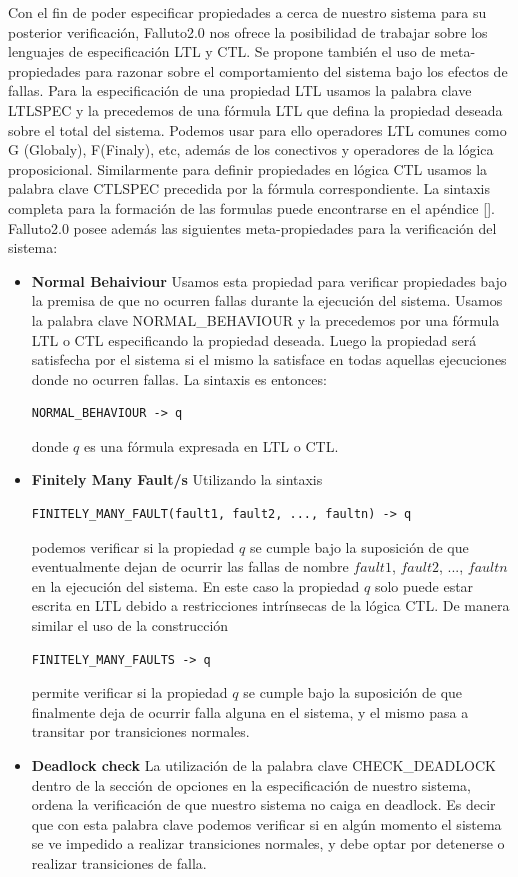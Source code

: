 \documentclass[titlepage, 12pt]{book}
\begin{document}
Con el fin de poder especificar propiedades a cerca de nuestro sistema para su posterior verificación, Falluto2.0 nos ofrece la posibilidad de trabajar sobre los lenguajes de especificación LTL y CTL. Se propone también el uso de meta-propiedades para razonar sobre el comportamiento del sistema bajo los efectos de fallas.
Para la especificación de una propiedad LTL usamos la palabra clave LTLSPEC y la precedemos de una fórmula LTL que defina la propiedad deseada sobre el total del sistema. Podemos usar para ello operadores LTL comunes como G (Globaly), F(Finaly), etc, además de los conectivos y operadores de la lógica proposicional. Similarmente para definir propiedades en lógica CTL usamos la palabra clave CTLSPEC precedida por la fórmula correspondiente. La sintaxis completa para la formación de las formulas puede encontrarse en el apéndice \ref{}.\\
Falluto2.0 posee además las siguientes meta-propiedades para la verificación del sistema:
\begin{itemize}
\item \textbf{Normal Behaiviour} Usamos esta propiedad para verificar propiedades bajo la premisa de que no ocurren fallas durante la ejecución del sistema. Usamos la palabra clave NORMAL\_BEHAVIOUR y la precedemos por una fórmula LTL o CTL especificando la propiedad deseada. Luego la propiedad será satisfecha por el sistema si el mismo la satisface en todas aquellas ejecuciones donde no ocurren fallas. La sintaxis es entonces: \begin{verbatim}NORMAL_BEHAVIOUR -> q \end{verbatim} donde $q$ es una fórmula expresada en LTL o CTL.
\item \textbf{Finitely Many Fault/s} Utilizando la sintaxis \begin{verbatim}FINITELY_MANY_FAULT(fault1, fault2, ..., faultn) -> q\end{verbatim} podemos verificar si la propiedad $q$ se cumple bajo la suposición de que eventualmente dejan de ocurrir las fallas de nombre $fault1$, $fault2$, ..., $faultn$ en la ejecución del sistema. En este caso la propiedad $q$ solo puede estar escrita en LTL debido a restricciones intrínsecas de la lógica CTL. De manera similar el uso de la construcción \begin{verbatim}FINITELY_MANY_FAULTS -> q \end{verbatim} permite verificar si la propiedad $q$ se cumple bajo la suposición de que finalmente deja de ocurrir falla alguna en el sistema, y el mismo pasa a transitar por transiciones normales.
\item \textbf{Deadlock check} La utilización de la palabra clave CHECK\_DEADLOCK dentro de la sección de opciones en la especificación de nuestro sistema, ordena la verificación de que nuestro sistema no caiga en deadlock. Es decir que con esta palabra clave podemos verificar si en algún momento el sistema se ve impedido a realizar transiciones normales, y debe optar por detenerse o realizar transiciones de falla.
\end{itemize}
\end{document}
